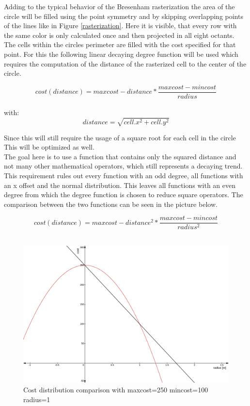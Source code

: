 Adding to the typical behavior of the Bresenham rasterization the area of the circle will be filled using the point symmetry and by skipping overlapping points of the lines like in Figure \ref{rasterization}. Here it is visible, that every row with the same color is only calculated once and then projected in all eight octants. 
The cells within the circles perimeter are filled with the cost specified for that point. For this the following linear decaying  degree function will be used which requires the computation of the distance of the rasterized cell to the center of the circle.

\[cost(distance)=maxcost-distance*\frac{maxcost-mincost}{radius}\]\\
with: \[distance=\sqrt{cell.x^2+cell.y^2}\]

 Since this will still require the usage of a square root for each cell in the circle This will be optimized as well.\\

The goal here is to use a function that contains only the squared distance and not many other mathematical operators, which still represents a decaying trend. This requirement rules out every function with an odd degree, all functions with an x offset and the normal distribution. This leaves all functions with an even degree from which the  degree function is chosen to reduce square operators. The comparison between the two functions can be seen in the picture below.

\[cost(distance)=maxcost-distance^2*\frac{maxcost-mincost}{radius^2}\]\\

\begin{figure}[H]
	\begin{center}
	\includegraphics[width=140mm]{Pictures/linear cost comparison}
	\caption{Cost distribution comparison with maxcost=250 mincost=100 radius=1}
	\end{center}
\end{figure}

